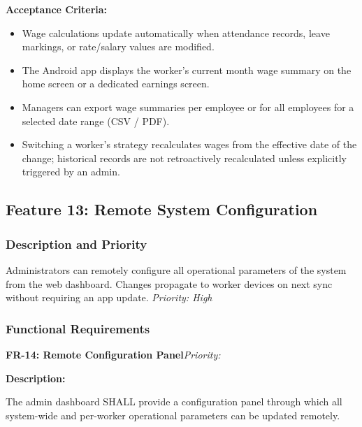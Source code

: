 \documentclass[12pt, a4paper]{article}
\newcommand{\frblock}[2]{%
    \noindent\textbf{#1}\hfill\textit{Priority: #2}%
    \par\smallskip%
}
\newcommand{\srsfield}[1]{\noindent\textbf{#1:}\par}
\begin{document}
\srsfield{Acceptance Criteria}
\begin{itemize}
    \item Wage calculations update automatically when attendance records,
          leave markings, or rate/salary values are modified.
    \item The Android app displays the worker's current month wage
          summary on the home screen or a dedicated earnings screen.
    \item Managers can export wage summaries per employee or for all
          employees for a selected date range (CSV / PDF).
    \item Switching a worker's strategy recalculates wages from the
          effective date of the change; historical records are not
          retroactively recalculated unless explicitly triggered by
          an admin.
\end{itemize}

\subsection{Feature 13: Remote System Configuration}

\subsubsection*{Description and Priority}
Administrators can remotely configure all operational parameters of the
system from the web dashboard. Changes propagate to worker devices on
next sync without requiring an app update.
\hfill \textit{Priority: High}

\subsubsection*{Functional Requirements}

\frblock{FR-14: Remote Configuration Panel}{}

\srsfield{Description}
The admin dashboard SHALL provide a configuration panel through which
all system-wide and per-worker operational parameters can be updated
remotely.
\end{document}
